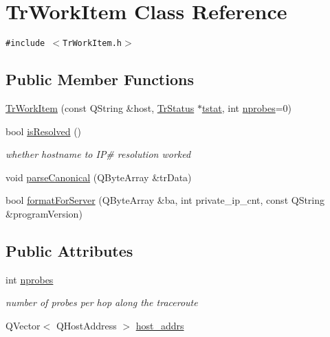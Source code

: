 \hypertarget{classTrWorkItem}{
\section{TrWorkItem Class Reference}
\label{classTrWorkItem}
}
{\tt \#include $<$TrWorkItem.h$>$}

\subsection*{Public Member Functions}
\begin{CompactItemize}
\item 
\hyperlink{classTrWorkItem_4316e5497fae321cd211ac3cafd60b4d}{TrWorkItem} (const QString \&host, \hyperlink{classTrStatus}{TrStatus} $\ast$\hyperlink{classTrWorkItem_4270cd5b74c069865aff5881900ff307}{tstat}, int \hyperlink{classTrWorkItem_efbff2fd78cb5e3abda6bcc51a70a072}{nprobes}=0)
\item 
bool \hyperlink{classTrWorkItem_e95da0459466fe9c4cd30384e75dfc1c}{isResolved} ()
\begin{CompactList}\small\item\em whether hostname to IP\# resolution worked \item\end{CompactList}\item 
void \hyperlink{classTrWorkItem_9410f63d30b40f24b452243f1f5f0a48}{parseCanonical} (QByteArray \&trData)
\item 
bool \hyperlink{classTrWorkItem_5e3ff6cc58c4411661b93e4280613b43}{formatForServer} (QByteArray \&ba, int private\_\-ip\_\-cnt, const QString \&programVersion)
\end{CompactItemize}
\subsection*{Public Attributes}
\begin{CompactItemize}
\item 
\hypertarget{classTrWorkItem_efbff2fd78cb5e3abda6bcc51a70a072}{
int \hyperlink{classTrWorkItem_efbff2fd78cb5e3abda6bcc51a70a072}{nprobes}}
\label{classTrWorkItem_efbff2fd78cb5e3abda6bcc51a70a072}

\begin{CompactList}\small\item\em number of probes per hop along the traceroute \item\end{CompactList}\item 
QVector$<$ QHostAddress $>$ \hyperlink{classTrWorkItem_bec5a48d1d5cf74bb01453ab708e4aeb}{host\_\-addrs}
\end{CompactItemize}
